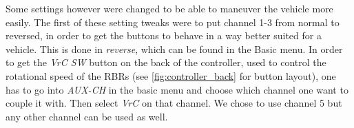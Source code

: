Some settings however were changed to be able to maneuver the vehicle
more easily. The first of these setting tweaks were to put channel 1-3 from
normal to reversed, in order to get the buttons to behave in a way better
suited for a vehicle. This is done in \textit{reverse}, which can be found in the
Basic menu. In order to get the \textit{VrC SW} button on the back of the
controller, used to control the rotational speed of the RBRs (see
\cref{fig:controller_back} for button layout), one has to go into
\textit{AUX-CH} in the basic menu and choose which channel  one want to couple
it with. Then select \textit{VrC} on that channel. We chose to use channel 5
but any other channel can be used as well.
